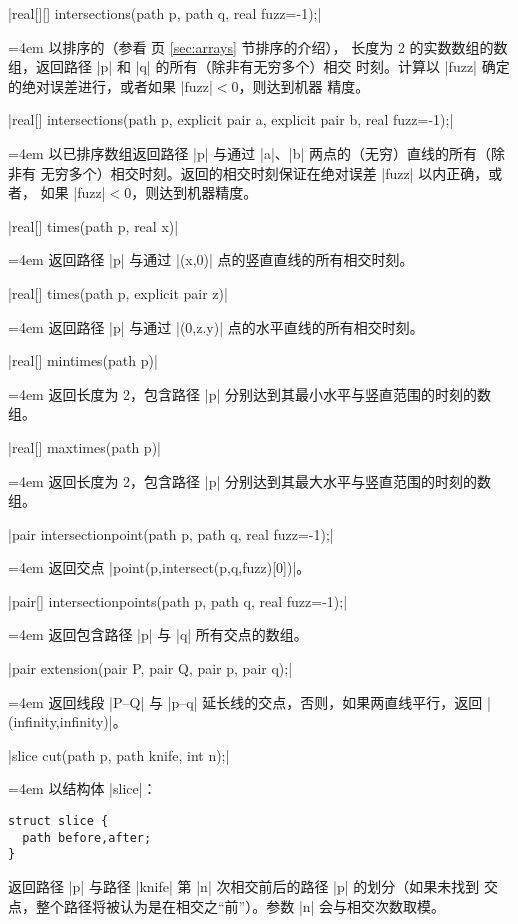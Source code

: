 \documentclass{ctexbook}
\makeatletter
\newenvironment{funclist}{\trivlist
  \parindent=0pt
\item[]
  \def\item{\medskip\par\leftskip=0pt}
  \def\go{\par\leftskip=4em}}
{\endtrivlist}
\newenvironment{typelist}{\itemize
  \let\old@item\@item
  \def\@item[##1]{\expandafter\old@item[\ttfamily\color{type!50!black}##1]}}
{\enditemize}
\makeatother
\begin{document}
\begin{typelist}
\begin{funclist}
\item |real[][] intersections(path p, path q, real fuzz=-1);| \go
  以排序的（参看 \pageref{sec:arrays} 页 \ref{sec:arrays} 节排序的介绍），
  长度为 2 的实数数组的数组，返回路径 |p| 和 |q| 的所有（除非有无穷多个）相交
  时刻。计算以 |fuzz| 确定的绝对误差进行，或者如果 |fuzz|${}<0$，则达到机器
  精度。

\item |real[] intersections(path p, explicit pair a, explicit pair b, real fuzz=-1);| \go
  以已排序数组返回路径 |p| 与通过 |a|、|b| 两点的（无穷）直线的所有（除非有
  无穷多个）相交时刻。返回的相交时刻保证在绝对误差 |fuzz| 以内正确，或者，
  如果 |fuzz|${}<0$，则达到机器精度。

\item |real[] times(path p, real x)| \go
  返回路径 |p| 与通过 |(x,0)| 点的竖直直线的所有相交时刻。

\item |real[] times(path p, explicit pair z)| \go
  返回路径 |p| 与通过 |(0,z.y)| 点的水平直线的所有相交时刻。

\item |real[] mintimes(path p)| \go
  返回长度为 2，包含路径 |p| 分别达到其最小水平与竖直范围的时刻的数组。

\item |real[] maxtimes(path p)| \go
  返回长度为 2，包含路径 |p| 分别达到其最大水平与竖直范围的时刻的数组。

\item |pair intersectionpoint(path p, path q, real fuzz=-1);| \go
  返回交点 |point(p,intersect(p,q,fuzz)[0])|。

\item |pair[] intersectionpoints(path p, path q, real fuzz=-1);| \go
  返回包含路径 |p| 与 |q| 所有交点的数组。

\item |pair extension(pair P, pair Q, pair p, pair q);| \go
  返回线段 |P--Q| 与 |p--q| 延长线的交点，否则，如果两直线平行，返回
  |(infinity,infinity)|。

\item |slice cut(path p, path knife, int n);| \go
  以结构体 |slice|：
\begin{lstlisting}
struct slice {
  path before,after;
}
\end{lstlisting}
  返回路径 |p| 与路径 |knife| 第 |n| 次相交前后的路径 |p| 的划分（如果未找到
  交点，整个路径将被认为是在相交之“前”）。参数 |n| 会与相交次数取模。


\end{funclist}
\end{typelist}
\end{document}
